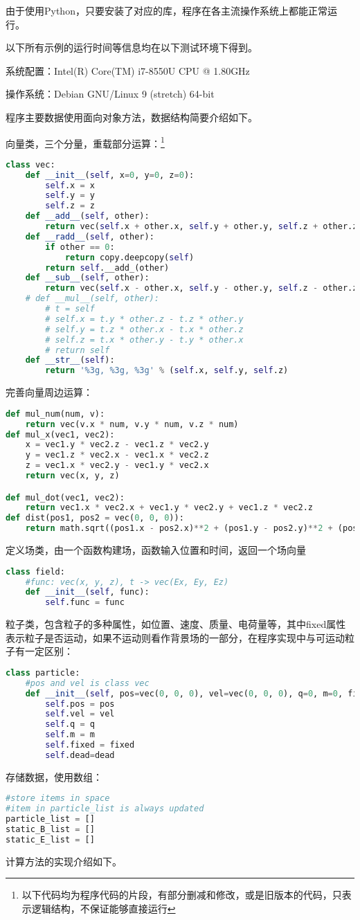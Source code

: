 \documentclass[UTF-8,cs4size]{ctexart}
\begin{document}
由于使用Python，只要安装了对应的库，程序在各主流操作系统上都能正常运行。


以下所有示例的运行时间等信息均在以下测试环境下得到。


系统配置：Intel(R) Core(TM) i7-8550U CPU @ 1.80GHz


操作系统：Debian GNU/Linux 9 (stretch) 64-bit


程序主要数据使用面向对象方法，数据结构简要介绍如下。


向量类，三个分量，重载部分运算：\footnote{以下代码均为程序代码的片段，有部分删减和修改，或是旧版本的代码，只表示逻辑结构，不保证能够直接运行}
\begin{lstlisting}[language=Python]
class vec:
    def __init__(self, x=0, y=0, z=0):
        self.x = x
        self.y = y
        self.z = z
    def __add__(self, other):
        return vec(self.x + other.x, self.y + other.y, self.z + other.z)
    def __radd__(self, other):
        if other == 0:
            return copy.deepcopy(self)
        return self.__add_(other)
    def __sub__(self, other):
        return vec(self.x - other.x, self.y - other.y, self.z - other.z)
    # def __mul__(self, other):
        # t = self
        # self.x = t.y * other.z - t.z * other.y
        # self.y = t.z * other.x - t.x * other.z
        # self.z = t.x * other.y - t.y * other.x
        # return self
    def __str__(self):
        return '%3g, %3g, %3g' % (self.x, self.y, self.z)
\end{lstlisting}
完善向量周边运算：
\begin{lstlisting}[language=Python]
def mul_num(num, v):
    return vec(v.x * num, v.y * num, v.z * num)
def mul_x(vec1, vec2):
    x = vec1.y * vec2.z - vec1.z * vec2.y
    y = vec1.z * vec2.x - vec1.x * vec2.z
    z = vec1.x * vec2.y - vec1.y * vec2.x
    return vec(x, y, z)

def mul_dot(vec1, vec2):
    return vec1.x * vec2.x + vec1.y * vec2.y + vec1.z * vec2.z
def dist(pos1, pos2 = vec(0, 0, 0)):
    return math.sqrt((pos1.x - pos2.x)**2 + (pos1.y - pos2.y)**2 + (pos1.z - pos2.z)**2)
\end{lstlisting}
定义场类，由一个函数构建场，函数输入位置和时间，返回一个场向量
\begin{lstlisting}[language=Python]
class field:
    #func: vec(x, y, z), t -> vec(Ex, Ey, Ez)
    def __init__(self, func):
        self.func = func
\end{lstlisting}
粒子类，包含粒子的多种属性，如位置、速度、质量、电荷量等，其中fixed属性表示粒子是否运动，如果不运动则看作背景场的一部分，在程序实现中与可运动粒子有一定区别：
\begin{lstlisting}[language=Python]
class particle:
    #pos and vel is class vec
    def __init__(self, pos=vec(0, 0, 0), vel=vec(0, 0, 0), q=0, m=0, fixed=0, dead=0):
        self.pos = pos
        self.vel = vel
        self.q = q
        self.m = m
        self.fixed = fixed
        self.dead=dead
\end{lstlisting}
存储数据，使用数组：
\begin{lstlisting}[language=Python]
#store items in space
#item in particle_list is always updated
particle_list = []
static_B_list = []
static_E_list = []
\end{lstlisting}
计算方法的实现介绍如下。
\end{document}
